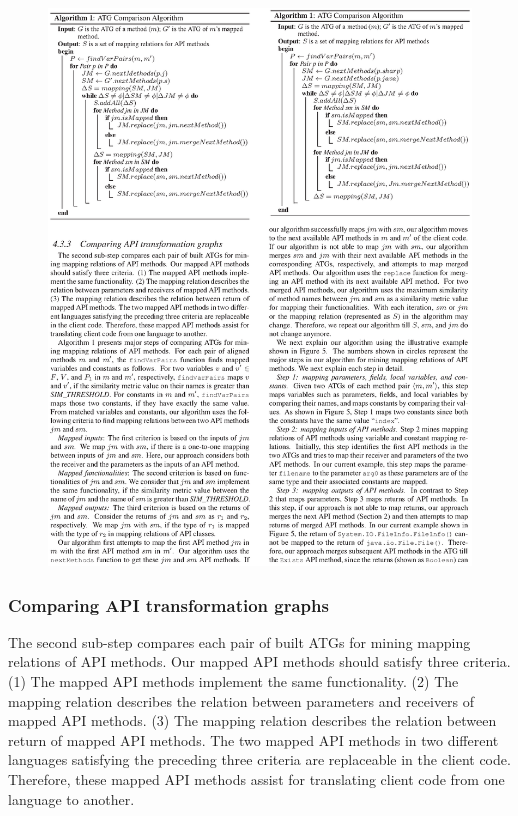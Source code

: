 \begin{figure}[t]
\centering
\includegraphics[scale=1,clip]{figure/algorithm2.eps}
\vspace*{-7ex}
\end{figure}

\subsubsection{Comparing API transformation graphs}

The second sub-step compares each pair of built ATGs for mining
mapping relations of API methods. Our mapped API methods should satisfy
three criteria. (1) The mapped API methods implement the same
functionality. (2) The mapping relation describes the relation between
parameters and receivers of mapped API methods. (3) The mapping relation
describes the relation between return of mapped API methods.
The two mapped API methods in two different languages satisfying the
preceding three criteria are replaceable in the client code.
Therefore, these mapped API methods assist for translating client
code from one language to another.

